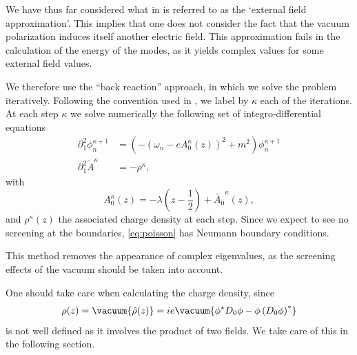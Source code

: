 We have thus far considered what in \cite{Ambjorn1983} is referred to as the `external field approximation'. This implies that one does not consider the fact that the vacuum polarization induces itself another electric field. This approximation fails \cite{Ambjorn1983} in the calculation of the energy of the modes, as it yields complex values for some external field values.


We therefore use the ``back reaction'' approach, in which we solve the problem iteratively. Following the convention used in \cite{Ambjorn1983}, we label by $\kappa$ each of the iterations. At each step $\kappa$ we solve numerically the following set of integro-differential equations
\begin{align}
	\partial_1^2 \phi^{\kappa+1}_n &=
	\left( - (\omega_n - e A^{\kappa}_0(z))^2 + m^2 \right) \phi^{\kappa+1}_n\\
	\partial_1^2\tilde{A}^{\kappa} &= -\rho^{\kappa}
	\label{eq:poisson}
,
\end{align}
with $$A_0^{\kappa}(z) = -\lambda \left( z - \frac{1}{2} \right) + \tilde{A_0}^{\kappa}(z),$$  and $\rho^{\kappa}(z)$ the associated charge density at each step.
Since we expect to see no screening at the boundaries, \eqref{eq:poisson} has Neumann boundary conditions.


This method removes the appearance of complex eigenvalues, as the screening effects of the vacuum should be taken into account.

One should take care when calculating the charge density, since 
\begin{align}
	\rho(z) = \vacuum{\hat{\rho}(z)} = ie\vacuum{\phi^* D_0 \phi - \phi \left( D_0 \phi \right) ^*}
\end{align}
is not well defined as it involves the product of two fields. We take care of this in the following section.

